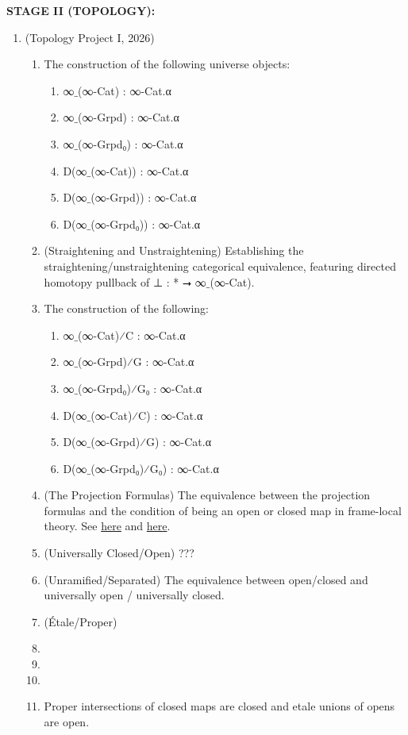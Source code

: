 \documentclass{book}
\begin{document}
{\bf STAGE II (TOPOLOGY):}
\begin{enumerate}
\item (Topology Project I, 2026)
\begin{enumerate}
\item The construction of the following universe objects:
\begin{enumerate}
\item ∞${}\_$(∞-Cat) : ∞-Cat.α
\item ∞${}\_$(∞-Grpd) : ∞-Cat.α
\item ∞${}\_$(∞-Grpd₀) : ∞-Cat.α
\item D(∞${}\_$(∞-Cat)) : ∞-Cat.α
\item D(∞${}\_$(∞-Grpd)) : ∞-Cat.α
\item D(∞${}\_$(∞-Grpd₀)) : ∞-Cat.α
\end{enumerate}
\item (Straightening and Unstraightening) Establishing the straightening/unstraightening categorical equivalence, featuring directed homotopy pullback of ⊥ : * ⭢ ∞${}\_$(∞-Cat).
\item The construction of the following:
\begin{enumerate}
\item ∞${}\_$(∞-Cat)⁄C : ∞-Cat.α
\item ∞${}\_$(∞-Grpd)⁄G : ∞-Cat.α
\item ∞${}\_$(∞-Grpd₀)⁄G₀ : ∞-Cat.α
\item D(∞${}\_$(∞-Cat)⁄C) : ∞-Cat.α
\item D(∞${}\_$(∞-Grpd)⁄G) : ∞-Cat.α
\item D(∞${}\_$(∞-Grpd₀)⁄G₀) : ∞-Cat.α
\end{enumerate}
\item (The Projection Formulas) The equivalence between the projection formulas and the condition of being an open or closed map in frame-local theory. See \href{https://ncatlab.org/nlab/show/closed+morphism}{here} and \href{https://ncatlab.org/nlab/show/open+morphism}{here}.
\item (Universally Closed/Open) ???
\item (Unramified/Separated) The equivalence between open/closed and universally open / universally closed.
\item (Étale/Proper) 
\item 
\item 
\item 
\item Proper intersections of closed maps are closed and etale unions of opens are open.

\end{enumerate}
\end{enumerate}
\end{document}
